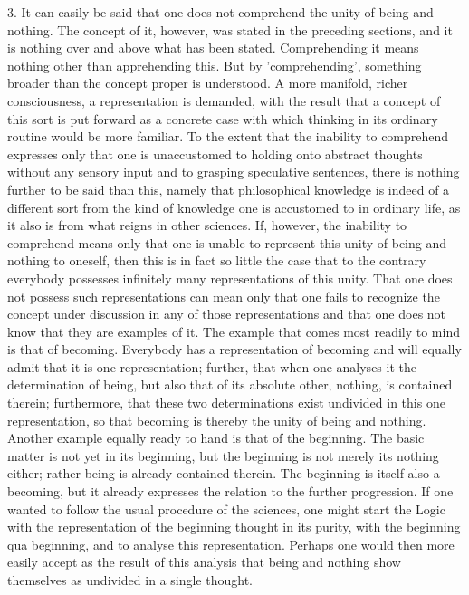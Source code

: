     3. It can easily be said that one does not comprehend
    the unity of being and nothing.
    The concept of it, however, was stated in the preceding sections,
    and it is nothing over and above what has been stated.
    Comprehending it means nothing other than apprehending this.
    But by 'comprehending', something broader than
    the concept proper is understood.
    A more manifold, richer consciousness,
    a representation is demanded,
    with the result that a concept of this sort is
    put forward as a concrete case with which
    thinking in its ordinary routine would be more familiar.
    To the extent that the inability to comprehend
    expresses only that one is unaccustomed to
    holding onto abstract thoughts without any sensory input
    and to grasping speculative sentences,
    there is nothing further to be said than this,
    namely that philosophical knowledge is indeed
    of a different sort from the kind of knowledge
    one is accustomed to in ordinary life,
    as it also is from what reigns in other sciences.
    If, however, the inability to comprehend means only
    that one is unable to represent this
    unity of being and nothing to oneself,
    then this is in fact so little the case
    that to the contrary everybody possesses
    infinitely many representations of this unity.
    That one does not possess such representations
    can mean only that one fails to recognize the concept
    under discussion in any of those representations
    and that one does not know that they are examples of it.
    The example that comes most readily to mind is that of becoming.
    Everybody has a representation of becoming
    and will equally admit that it is one representation;
    further, that when one analyses it the determination of being,
    but also that of its absolute other, nothing, is contained therein;
    furthermore, that these two determinations exist
    undivided in this one representation,
    so that becoming is thereby the unity of being and nothing.
    Another example equally ready to hand is that of the beginning.
    The basic matter is not yet in its beginning,
    but the beginning is not merely its nothing either;
    rather being is already contained therein.
    The beginning is itself also a becoming,
    but it already expresses the relation to the further progression.
    If one wanted to follow the usual procedure of the sciences,
    one might start the Logic with the representation of
    the beginning thought in its purity,
    with the beginning qua beginning,
    and to analyse this representation.
    Perhaps one would then more easily accept
    as the result of this analysis
    that being and nothing show themselves
    as undivided in a single thought.

